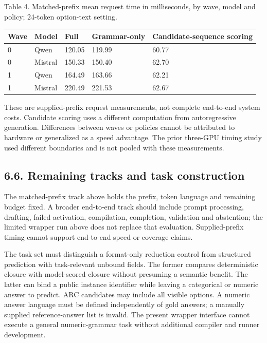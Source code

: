 \documentclass[
  12pt,
  a4paper,
]{article}
\begin{document}
Table 4. Matched-prefix mean request time in milliseconds, by wave, model and policy; 24-token option-text setting.

\begin{longtable}{@{}p{.08\linewidth}p{.16\linewidth}p{.13\linewidth}p{.19\linewidth}p{.30\linewidth}@{}}
\toprule
Wave & Model & Full & Grammar-only & Candidate-sequence scoring \\
\midrule
\endhead
0 & Qwen & 120.05 & 119.99 & 60.77 \\
0 & Mistral & 150.33 & 150.40 & 62.70 \\
1 & Qwen & 164.49 & 163.66 & 62.21 \\
1 & Mistral & 220.49 & 221.53 & 62.67 \\
\bottomrule
\end{longtable}

These are supplied-prefix request measurements, not complete end-to-end system costs. Candidate scoring uses a different computation from autoregressive generation. Differences between waves or policies cannot be attributed to hardware or generalized as a speed advantage. The prior three-GPU timing study used different boundaries and is not pooled with these measurements.

\subsection{6.6. Remaining tracks and task construction}

The matched-prefix track above holds the prefix, token language and remaining budget fixed. A broader end-to-end track should include prompt processing, drafting, failed activation, compilation, completion, validation and abstention; the limited wrapper run above does not replace that evaluation. Supplied-prefix timing cannot support end-to-end speed or coverage claims.

The task set must distinguish a format-only reduction control from structured prediction with task-relevant unbound fields. The former compares deterministic closure with model-scored closure without presuming a semantic benefit. The latter can bind a public instance identifier while leaving a categorical or numeric answer to predict. ARC candidates may include all visible options. A numeric answer language must be defined independently of gold answers; a manually supplied reference-answer list is invalid. The present wrapper interface cannot execute a general numeric-grammar task without additional compiler and runner development.
\end{document}
